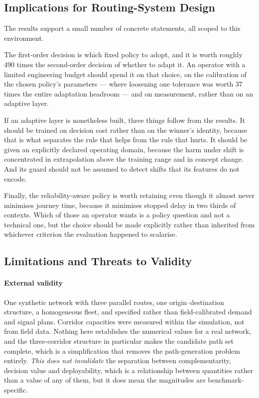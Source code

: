 \subsection{Implications for Routing-System Design}
\label{sec:disc:design}

The results support a small number of concrete statements, all scoped to this
environment.

The first-order decision is which fixed policy to adopt, and it is worth roughly
490 times the second-order decision of whether to adapt it. An operator with a
limited engineering budget should spend it on that choice, on the calibration of
the chosen policy's parameters --- where loosening one tolerance was worth 37
times the entire adaptation headroom --- and on measurement, rather than on an
adaptive layer.

If an adaptive layer is nonetheless built, three things follow from the results.
It should be trained on decision cost rather than on the winner's identity,
because that is what separates the rule that helps from the rule that hurts. It
should be given an explicitly declared operating domain, because the harm under
shift is concentrated in extrapolation above the training range and in concept
change. And its guard should not be assumed to detect shifts that its features do
not encode.

Finally, the reliability-aware policy is worth retaining even though it almost
never minimises journey time, because it minimises stopped delay in two thirds of
contexts. Which of those an operator wants is a policy question and not a
technical one, but the choice should be made explicitly rather than inherited from
whichever criterion the evaluation happened to scalarise.

\subsection{Limitations and Threats to Validity}
\label{sec:limits}

\paragraph{External validity} One synthetic network with three parallel routes,
one origin--destination structure, a homogeneous fleet, and specified rather than
field-calibrated demand and signal plans. Corridor capacities were measured within
the simulation, not from field data. Nothing here establishes the numerical values
for a real network, and the three-corridor structure in particular makes the
candidate path set complete, which is a simplification that removes the
path-generation problem entirely. \emph{This does not invalidate} the separation
between complementarity, decision value and deployability, which is a relationship
between quantities rather than a value of any of them, but it does mean the
magnitudes are benchmark-specific.


